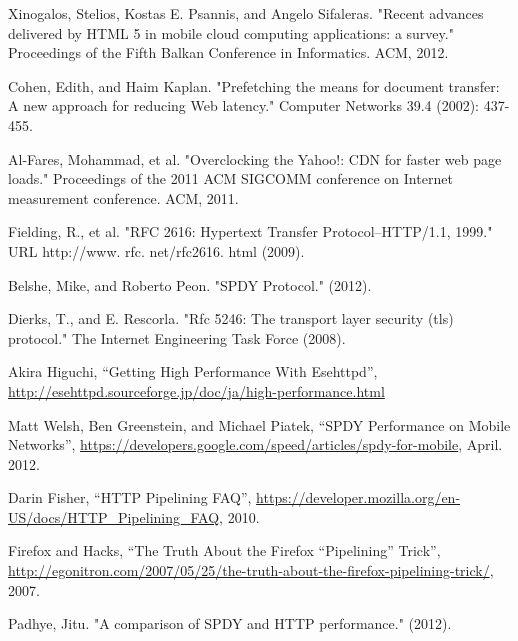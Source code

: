 \documentclass[twocolumn]{jsarticle}
\begin{document}
\begin{thebibliography}{99}
\begin{spacing}{0.7}
{\item Xinogalos, Stelios, Kostas E. Psannis, and Angelo Sifaleras. "Recent
advances delivered by HTML 5 in mobile cloud computing applications: a survey." Proceedings of the Fifth Balkan Conference in Informatics. ACM, 2012.
\label{bib:Xinogalos}

\item Cohen, Edith, and Haim Kaplan. "Prefetching the means for document
transfer: A new approach for reducing Web latency." Computer Networks 39.4 (2002): 437-455.
\label{bib:Edith}

\item Al-Fares, Mohammad, et al. "Overclocking the Yahoo!: CDN for faster web
page loads." Proceedings of the 2011 ACM SIGCOMM conference on Internet measurement conference. ACM, 2011.
\label{bib:Mohammad}

\item Fielding, R., et al. "RFC 2616: Hypertext Transfer Protocol–HTTP/1.1,
1999." URL http://www. rfc. net/rfc2616. html (2009).
\label{HTTP/1.1}

\item Belshe, Mike, and Roberto Peon. "SPDY Protocol." (2012).
\label{bib:SPDY}

\item Dierks, T., and E. Rescorla. "Rfc 5246: The transport layer security
(tls) protocol." The Internet Engineering Task Force (2008).
\label{bib:TLS}

\item Akira Higuchi, ``Getting High Performance With Esehttpd'',
\url{http://esehttpd.sourceforge.jp/doc/ja/high-performance.html}
\label{bib:Akira}

\item Matt Welsh, Ben Greenstein, and Michael Piatek, ``SPDY Performance on
Mobile Networks'',
\url{https://developers.google.com/speed/articles/spdy-for-mobile}, April. 2012.
\label{bib:SPDY_per}

\item Darin Fisher, ``HTTP Pipelining FAQ'',
\url{https://developer.mozilla.org/en-US/docs/HTTP_Pipelining_FAQ}, 2010.
\label{bib:firefox}

\item  Firefox and Hacks, ``The Truth About the Firefox “Pipelining” Trick'',
\url{http://egonitron.com/2007/05/25/the-truth-about-the-firefox-pipelining-trick/},
2007.
\label{bib:firefox2}

\item Padhye, Jitu. "A comparison of SPDY and HTTP performance." (2012).
\label{bib:Padhye}

}
\end{spacing}
\end{thebibliography}
\end{document}
